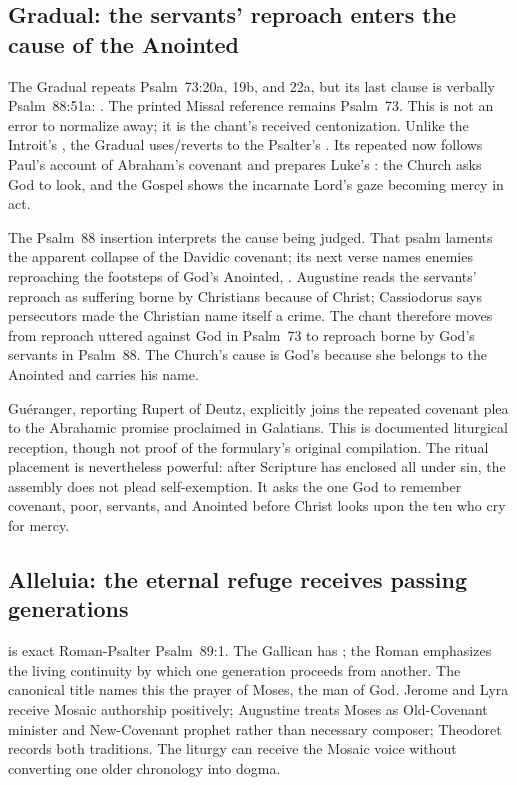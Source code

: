 \subsection*{Gradual: the servants' reproach enters the cause of the Anointed\enspace{}}

The Gradual repeats Psalm~73:20a, 19b, and 22a, but its last clause is verbally
Psalm~88:51a: . The printed Missal
reference remains Psalm~73. This is not an error to normalize away; it is the
chant's received centonization. Unlike the Introit's , the
Gradual uses/reverts to the Psalter's . Its repeated
 now follows Paul's account of Abraham's covenant and prepares
Luke's : the Church asks God to look, and the Gospel shows
the incarnate Lord's gaze becoming mercy in act.

The Psalm~88 insertion interprets the cause being judged. That psalm laments
the apparent collapse of the Davidic covenant; its next verse names enemies
reproaching the footsteps of God's Anointed, .
Augustine reads the servants' reproach as suffering borne by Christians
because of Christ; Cassiodorus says persecutors made the Christian name itself
a crime. The chant therefore moves from reproach uttered against God in
Psalm~73 to reproach borne by God's servants in Psalm~88. The Church's cause is
God's because she belongs to the Anointed and carries his name.

Guéranger, reporting Rupert of Deutz, explicitly joins the repeated covenant
plea to the Abrahamic promise proclaimed in Galatians. This is documented
liturgical reception, though not proof of the formulary's original compilation.
The ritual placement is nevertheless powerful: after Scripture has enclosed
all under sin, the assembly does not plead self-exemption. It asks the one God
to remember covenant, poor, servants, and Anointed before Christ looks upon the
ten who cry for mercy.

\subsection*{Alleluia: the eternal refuge receives passing generations\enspace{}}

 is exact
Roman-Psalter Psalm~89:1. The Gallican has ;
the Roman  emphasizes the living continuity by which one
generation proceeds from another. The canonical title names this the prayer
of Moses, the man of God. Jerome and Lyra receive Mosaic authorship positively;
Augustine treats Moses as Old-Covenant minister and New-Covenant prophet rather
than necessary composer; Theodoret records both traditions. The liturgy can
receive the Mosaic voice without converting one older chronology into dogma.

